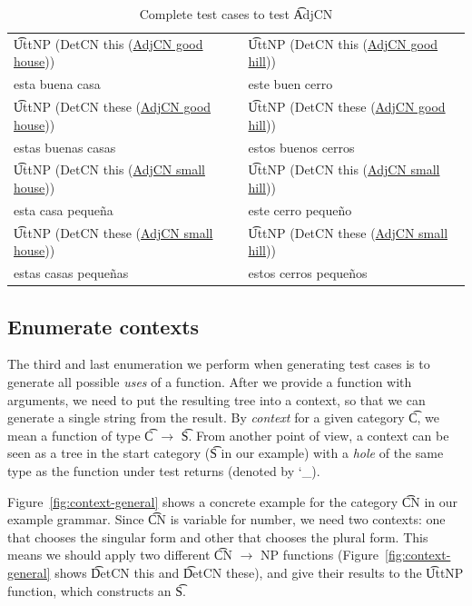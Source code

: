 \begin{table}[b]
\centering
\begin{tabular}{| l | l |}
\hline
\t{UttNP (DetCN this
    (\underline{AdjCN good house}))} & \t{UttNP (DetCN this
                                            (\underline{AdjCN good hill}))} \\
esta buena casa          & este buen cerro \\ \hline
\t{UttNP (DetCN these
    (\underline{AdjCN good house}))} & \t{UttNP (DetCN these
                                            (\underline{AdjCN good hill}))} \\
estas buenas casas       & estos buenos cerros \\ \hline
\t{UttNP (DetCN this
    (\underline{AdjCN small house}))} & \t{UttNP (DetCN this
                                            (\underline{AdjCN small hill}))} \\
esta casa peque\~{n}a          & este cerro peque\~{n}o \\ \hline
\t{UttNP (DetCN these
    (\underline{AdjCN small house}))} & \t{UttNP (DetCN these
                                            (\underline{AdjCN small hill}))} \\
estas casas peque\~{n}as      & estos cerros peque\~{n}os \\ \hline
\end{tabular}
\caption{Complete test cases to test \t{AdjCN}}
\label{tab:testCases}
\end{table}


\subsection{Enumerate contexts}

The third and last enumeration we perform when generating test cases
is to generate all possible \emph{uses} of a function. After we
provide a function with arguments, we need to put the resulting tree
into a context, so that we can generate a single string from the
result. By \emph{context} for a given category \t{C}, we mean a
function of type \t{C} $\rightarrow$ \t{S}. From another point of view, a context
can be seen as a tree in the start category (\t{S}
in our example) with a \emph{hole} of the same type as the function
under test returns (denoted by \char`_).

Figure~\ref{fig:context-general} shows a concrete example for the
category \t{CN} in our example grammar.
Since \t{CN} is variable for number, we need two contexts:
one that chooses the singular form and other that chooses the plural
form.  This means we should apply two different \t{CN
  $\rightarrow$ NP} functions (Figure~\ref{fig:context-general} shows
\t{DetCN this} and \t{DetCN these}), and give their results to the
\t{UttNP} function, which constructs an \t{S}.

